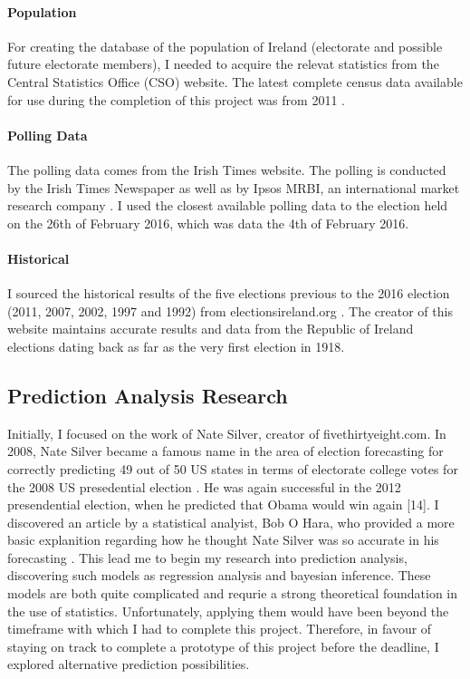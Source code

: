 \paragraph{Population}
For creating the database of the population of Ireland (electorate and possible future electorate members), I needed to acquire the relevat statistics from the Central Statistics Office (CSO) website. The latest complete census data available for use during the completion of this project was from 2011 \cite{cso}. 
\paragraph{Polling Data}
The polling data comes from the Irish Times website. The polling is conducted by the Irish Times Newspaper as well as by Ipsos MRBI, an international market research company \cite{irishtimes}. I used the closest available polling data to the election held on the 26th of February 2016, which was data the 4th of February 2016.
\paragraph{Historical}
I sourced the historical results of the five elections previous to the 2016 election (2011, 2007, 2002, 1997 and 1992) from electionsireland.org \cite{electionireland}. The creator of this website maintains accurate results and data from the Republic of Ireland elections dating back as far as the very first election in 1918.  
\subsection{Prediction Analysis Research}
Initially, I focused on the work of Nate Silver, creator of fivethirtyeight.com. In 2008, Nate Silver became a famous name in the area of election forecasting for correctly predicting 49 out of 50 US states in terms of electorate college votes for the 2008 US presedential election \cite{natenytimes}. He was again successful in the 2012 presendential election, when he predicted that Obama would win again [14]. I discovered an article by a statistical analyist, Bob O Hara, who provided a more basic explanition regarding how he thought Nate Silver was so accurate in his forecasting \cite{bobohara}. This lead me to begin my research into prediction analysis, discovering such models as regression analysis and bayesian inference. These models are both quite complicated and requrie a strong theoretical foundation in the use of statistics. Unfortunately, applying them would have been beyond the timeframe with which I had to complete this project. Therefore, in favour of staying on track to complete a prototype of this project before the deadline, I explored alternative prediction possibilities.
 
